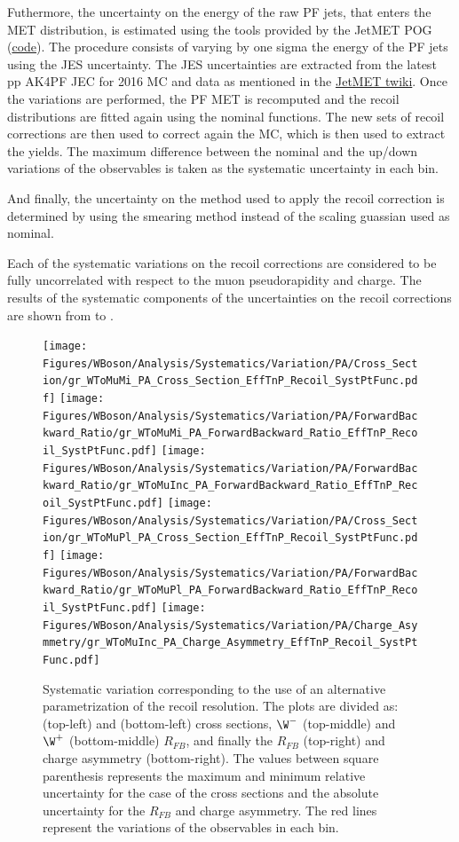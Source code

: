 \clearpage
Futhermore, the uncertainty on the energy of the raw PF jets, that enters the MET distribution, is estimated using the tools provided by the JetMET POG (\href{https://twiki.cern.ch/twiki/bin/view/CMS/MissingETUncertaintyPrescription}{code}). The procedure consists of varying by one sigma the energy of the PF jets using the JES uncertainty. The JES uncertainties are extracted from the latest pp AK4PF JEC for 2016 MC and data as mentioned in the \href{https://twiki.cern.ch/twiki/bin/view/CMS/JECDataMC}{JetMET twiki}. Once the variations are performed, the PF MET is recomputed and the recoil distributions are fitted again using the nominal functions. The new sets of recoil corrections are then used to correct again the MC, which is then used to extract the \W yields. The maximum difference between the nominal and the up/down variations of the observables is taken as the systematic uncertainty in each bin.

And finally, the uncertainty on the method used to apply the recoil correction is determined by using the smearing method instead of the scaling guassian used as nominal.

Each of the systematic variations on the recoil corrections are considered to be fully uncorrelated with respect to the muon pseudorapidity and charge. The results of the systematic components of the uncertainties on the recoil corrections are shown from  to .

\begin{figure}[!htbp]
 \begin{center}
  \texttt{[image: Figures/WBoson/Analysis/Systematics/Variation/PA/Cross\_Section/gr\_WToMuMi\_PA\_Cross\_Section\_EffTnP\_Recoil\_SystPtFunc.pdf]}
  \texttt{[image: Figures/WBoson/Analysis/Systematics/Variation/PA/ForwardBackward\_Ratio/gr\_WToMuMi\_PA\_ForwardBackward\_Ratio\_EffTnP\_Recoil\_SystPtFunc.pdf]}
  \texttt{[image: Figures/WBoson/Analysis/Systematics/Variation/PA/ForwardBackward\_Ratio/gr\_WToMuInc\_PA\_ForwardBackward\_Ratio\_EffTnP\_Recoil\_SystPtFunc.pdf]}
  \texttt{[image: Figures/WBoson/Analysis/Systematics/Variation/PA/Cross\_Section/gr\_WToMuPl\_PA\_Cross\_Section\_EffTnP\_Recoil\_SystPtFunc.pdf]}
  \texttt{[image: Figures/WBoson/Analysis/Systematics/Variation/PA/ForwardBackward\_Ratio/gr\_WToMuPl\_PA\_ForwardBackward\_Ratio\_EffTnP\_Recoil\_SystPtFunc.pdf]}
  \texttt{[image: Figures/WBoson/Analysis/Systematics/Variation/PA/Charge\_Asymmetry/gr\_WToMuInc\_PA\_Charge\_Asymmetry\_EffTnP\_Recoil\_SystPtFunc.pdf]}
 \end{center}
 \caption{Systematic variation corresponding to the use of an alternative parametrization of the recoil resolution. The plots are divided as: \WToMuNuMi (top-left) and \WToMuNuPl (bottom-left) cross sections, $\W^{-}$ (top-middle) and $\W^{+}$ (bottom-middle) $R_{FB}$, and finally the \W $R_{FB}$ (top-right) and \W charge asymmetry (bottom-right). The values between square parenthesis represents the maximum and minimum relative uncertainty for the case of the cross sections and the absolute uncertainty for the $R_{FB}$ and charge asymmetry. The red lines represent the variations of the observables in each bin.}
 \label{fig:Recoil_SystPtFunc}
\end{figure}

